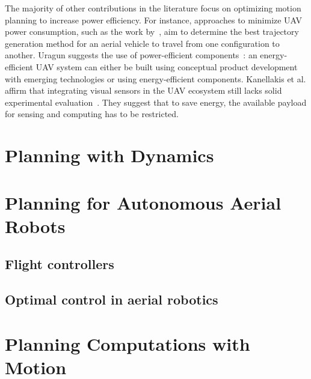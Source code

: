 The majority of other contributions in the literature focus on optimizing motion planning to increase power efficiency. For instance, approaches to minimize UAV power consumption, such as the work by~\citep{kreciglowa2017energy}, aim to determine the best trajectory generation method for an aerial vehicle to travel from one configuration to another. Uragun suggests the use of power-efficient components~\citep{uragun2011energy}: an energy-efficient UAV system can either be built using conceptual product development with emerging technologies or using energy-efficient components. Kanellakis et al. affirm that integrating visual sensors in the UAV ecosystem still lacks solid experimental evaluation~\citep{kanellakis2017survey}. They suggest that to save energy, the available payload for sensing and computing has to be restricted.

\section{\color{orange}Planning with Dynamics}
\label{sec:soa-dynamics-pl}

\section{\color{orange}Planning for Autonomous Aerial Robots}
\label{sec:soa-aerial-pl}

\subsection{\color{orange}Flight controllers}



\subsection{\color{orange}Optimal control in aerial robotics}


\section{\color{cyan}Planning Computations with Motion}
\label{sec:soa-comp-motion-pl}


